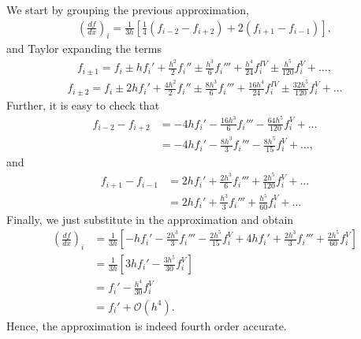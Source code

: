 \begin{questions}

\begin{solution}
We start by grouping the previous approximation,
\begin{align*}
\left(\frac{df}{dx}\right)_i=\frac{1}{3h}\left[\frac{1}{4}\left(f_{i-2}-f_{i+2}\right)+2\left(f_{i+1}-f_{i-1}\right)\right],
\end{align*}
and Taylor expanding the terms
\begin{align*}
f_{i\pm1} = f_i\pm hf_i'+\frac{h^2}{2}f_i''\pm \frac{h^3}{6}f_i'''+\frac{h^4}{24}f_i^{IV}\pm\frac{h^5}{120}f_i^{V}+\dots,
\end{align*}
\begin{align*}
f_{i\pm2} = f_i\pm 2hf_i'+\frac{4h^2}{2}f_i''\pm \frac{8h^3}{6}f_i'''+\frac{16h^4}{24}f_i^{IV}\pm\frac{32h^5}{120}f_i^{V}+\dots
\end{align*}
Further, it is easy to check that
\begin{align*}
f_{i-2}-f_{i+2}&=-4hf_i'- \frac{16h^3}{6}f_i'''-\frac{64h^5}{120}f_i^{V}+\dots\\
&=-4hf_i'- \frac{8h^3}{3}f_i'''-\frac{8h^5}{15}f_i^{V}+\dots,
\end{align*}
and
\begin{align*}
f_{i+1}-f_{i-1}&=2hf_i'+ \frac{2h^3}{6}f_i'''+\frac{2h^5}{120}f_i^{V}+\dots\\
&=2hf_i'+ \frac{h^3}{3}f_i'''+\frac{h^5}{60}f_i^{V}+\dots
\end{align*}
Finally, we just substitute in the approximation and obtain
\begin{align*}
\left(\frac{df}{dx}\right)_i&=\frac{1}{3h}\left[-hf_i'- \frac{2h^3}{3}f_i'''-\frac{2h^5}{15}f_i^{V}+4hf_i'+ \frac{2h^3}{3}f_i'''+\frac{2h^5}{60}f_i^{V}\right]\\
&=\frac{1}{3h}\left[3hf_i'-\frac{3h^5}{30}f_i^{V}\right]\\
&=f_i'-\frac{h^4}{30}f_i^{V}\\
&=f_i'+\mathcal{O}(h^4).
\end{align*}
Hence, the approximation is indeed fourth order accurate.
\end{solution}
\end{questions}
